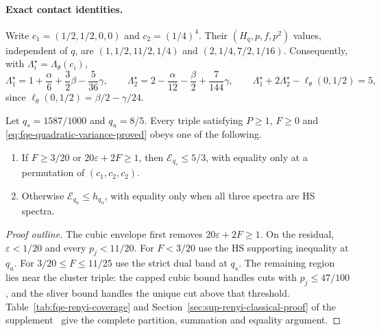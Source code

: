 \paragraph{Exact contact identities.}
Write $c_1=(1/2,1/2,0,0)$ and $c_2=(1/4)^4$.
Their $(H_q,p,f,p^2)$ values, independent of $q$, are
$(1,1/2,11/2,1/4)$ and $(2,1/4,7/2,1/16)$.
Consequently, with $\Lambda^\star_i=\Lambda_\theta(c_i)$,
\[
\Lambda^\star_1=1+\frac\alpha6+\frac32\beta-\frac5{36}\gamma,
\qquad \Lambda^\star_2=2-\frac\alpha{12}-\frac\beta2+\frac7{144}\gamma,
\qquad \Lambda^\star_1+2\Lambda^\star_2-\ell_\theta(0,1/2)=5,
\tag{DC}\label{eq:fqe-dual-contact}
\]
since $\ell_\theta(0,1/2)=\beta/2-\gamma/24$.
\begin{theorem}
\label{thm:fqe-renyi-classical}
Let $q_s=1587/1000$ and $q_u=8/5$. Every triple satisfying $P\ge1$, $F\ge0$ and
\eqref{eq:fqe-quadratic-variance-proved} obeys one of the following.
\begin{enumerate}
\item If $F\ge3/20$ or $20\varepsilon+2F\ge1$, then $\mathcal E_{q_s}\le5/3$, with equality only at a permutation of
$(c_1,c_2,c_2)$.
\item Otherwise $\mathcal E_{q_u}\le h_{q_u}$, with equality only when all three spectra are HS spectra.
\end{enumerate}
\end{theorem}
\begin{proof}[Proof outline]
The cubic envelope first removes $20\varepsilon+2F\ge1$.
On the residual, $\varepsilon<1/20$ and every $p_j<11/20$.
For $F<3/20$ use the HS supporting inequality at $q_u$.
For $3/20\le F\le11/25$ use the strict dual band at $q_s$.
The remaining region lies near the cluster triple: the capped cubic bound
handles cuts with $p_j\le47/100$, and the sliver bound handles the unique
cut above that threshold. Table~\ref{tab:fqe-renyi-coverage} and
Section~\ref{sec:sup-renyi-classical-proof} of the supplement~\cite{Companion}
give the complete partition, summation and equality argument.
\end{proof}


